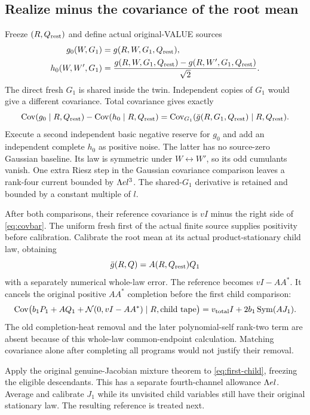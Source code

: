 \documentclass[11pt]{article}
\numberwithin{equation}{section}
\theoremstyle{remark}\newtheorem{remark}[theorem]{Remark}
\newcommand{\N}{\mathcal N}\newcommand{\Cov}{\operatorname{Cov}}
\newcommand{\Sym}{\operatorname{Sym}}\newcommand{\HS}{\mathrm{HS}}
\begin{document}
\subsection{Realize minus the covariance of the root mean}
Freeze $(R,Q_{\rm rest})$ and define actual original-VALUE sources
\begin{align}\label{eq:g0-h0}
 g_0(W,G_1)&=g(R,W,G_1,Q_{\rm rest}),\notag\\
 h_0(W,W',G_1)&=
 \frac{g(R,W,G_1,Q_{\rm rest})-g(R,W',G_1,Q_{\rm rest})}{\sqrt2}.
\end{align}
The direct fresh $G_1$ is shared inside the twin. Independent copies of $G_1$ would give a different covariance. Total covariance gives exactly
\begin{equation}\label{eq:covbar}
 \Cov(g_0\mid R,Q_{\rm rest})-\Cov(h_0\mid R,Q_{\rm rest})
 =\Cov_{G_1}(\bar g(R,G_1,Q_{\rm rest})\mid R,Q_{\rm rest}).
\end{equation}
Execute a second independent basic negative reserve for $g_0$ and add an independent complete $h_0$ as positive noise. The latter has no source-zero Gaussian baseline. Its law is symmetric under $W\leftrightarrow W'$, so its odd cumulants vanish. One extra Riesz step in the Gaussian covariance comparison leaves a rank-four current bounded by $\Lambda el^3$. The shared-$G_1$ derivative is retained and bounded by a constant multiple of $l$.

After both comparisons, their reference covariance is $vI$ minus the right side of \eqref{eq:covbar}. The uniform fresh first of the actual finite source supplies positivity before calibration. Calibrate the root mean at its actual product-stationary child law, obtaining
\[
 \bar g(R,Q)=A(R,Q_{\rm rest})Q_1
\]
with a separately numerical whole-law error. The reference becomes $vI-AA^*$. It cancels the original positive $AA^*$ completion before the first child comparison:
\begin{equation}\label{eq:first-child}
 \Cov\bigl(b_1P_1+A Q_1+\N(0,vI-AA^*)\mid R,\text{child tape}\bigr)
 =v_{\rm total}I+2b_1\Sym(AJ_1).
\end{equation}
The old completion-heat removal and the later polynomial-self rank-two term are absent because of this whole-law common-endpoint calculation. Matching covariance alone after completing all programs would not justify their removal.

Apply the original genuine-Jacobian mixture theorem to \eqref{eq:first-child}, freezing the eligible descendants. This has a separate fourth-channel allowance $\Lambda el$. Average and calibrate $J_1$ while its unvisited child variables still have their original stationary law. The resulting reference is treated next.
\end{document}
